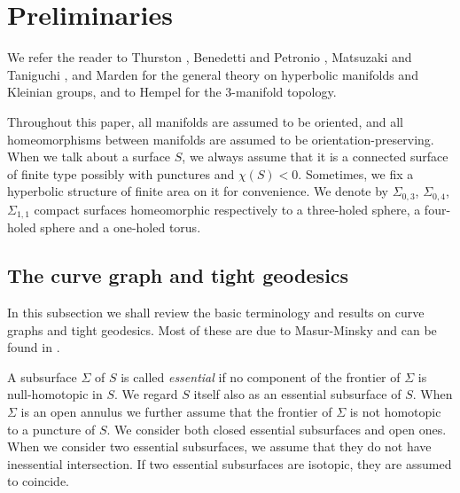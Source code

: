 \documentclass{amsart}
\theoremstyle{definition}
\numberwithin{figure}{section}
\numberwithin{equation}{section}
\def\Sg{\Sigma}
\def\Sg{\Sigma}
\begin{document}
\section{Preliminaries}\label{S_1}




We refer the reader to Thurston \cite{th1}, Benedetti and Petronio \cite{bp}, 
Matsuzaki and Taniguchi \cite{mt}, and Marden \cite{ma2} for the general theory on hyperbolic manifolds and Kleinian groups, and to 
Hempel \cite{he} for the 3-manifold topology.




Throughout this paper, all manifolds are assumed to be oriented, and all homeomorphisms between 
manifolds are assumed to be orientation-preserving.
When we talk about a surface $S$, we always assume that it is a connected surface of finite type possibly with punctures and $\chi(S) <0$.
Sometimes, we fix a hyperbolic structure of finite area on it for convenience.
We denote by $\Sg_{0,3}$, $\Sg_{0,4}$, $\Sg_{1,1}$ compact surfaces homeomorphic respectively to a three-holed sphere, a four-holed sphere and a one-holed torus.



\subsection{The curve graph and tight geodesics}\label{curve}
%
In this subsection we shall review the basic terminology and results on curve graphs and tight geodesics.
Most of these are due  to Masur-Minsky and can be found in  \cite{mm1, mm2}.

A  subsurface $\Sigma$ of $S$ is called \emph{essential} if no component of the frontier of $\Sigma$ is null-homotopic in $S$.
We regard $S$ itself also as an essential subsurface of $S$.
When $\Sigma$ is an open annulus we further assume that the frontier of $\Sigma$ is not homotopic to a puncture of $S$.
We consider both closed essential subsurfaces and open ones.
When we consider two essential subsurfaces, we assume that they do not have inessential intersection.
If two essential subsurfaces are isotopic, they are assumed to coincide.
\end{document}
